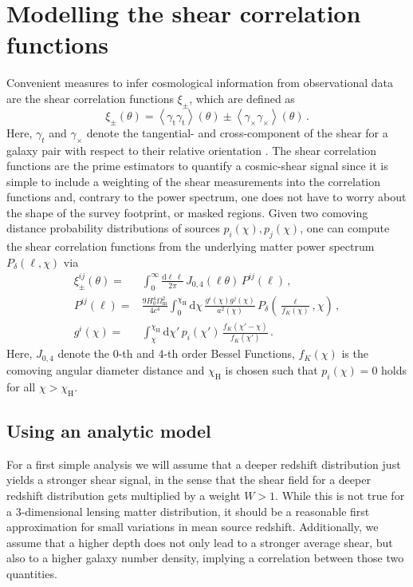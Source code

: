 \documentclass[referee]{aa} %
\renewcommand{\[}{\begin{equation}}
\renewcommand{\]}{\end{equation}}
\renewcommand{\rm}{\mathrm}
\def\la{\left<}
\def\ra{\right>}
\begin{document}

\section{Modelling the shear correlation functions}
\label{sec:xipm}
Convenient measures to infer cosmological information from observational data are the shear correlation functions $\xi_\pm$, which are defined as \[
\xi_\pm(\theta) = \la \gamma_{\rm t}\gamma_{\rm t}\ra(\theta) \pm \la \gamma_\times\gamma_\times\ra(\theta) \, .
\]
Here, $\gamma_t$ and $\gamma_\times$ denote the tangential- and cross-component of the shear for a galaxy pair with respect to their relative orientation \citep[compare][]{2002A&A...396....1S}.
The shear correlation functions are the prime estimators to quantify a cosmic-shear signal since it is simple to include a weighting of the shear measurements into the correlation functions and, contrary to the power spectrum, one does not have to worry about the shape of the survey footprint, or masked regions. Given two comoving distance probability distributions of sources $p_i(\chi),p_j(\chi)$, one can compute the shear correlation functions from the underlying matter power spectrum $P_\delta(\ell,\chi)$ via \citep[compare][]{1992ApJ...388..272K} \begin{align}
\label{eq:xipm-pkappa}
\xi_\pm^{ij}(\theta) =& \int_0^\infty \frac{{\rm d}\ell\,\ell}{2\pi}\, J_{0,4}(\ell\theta)\, P^{ij}(\ell)\, , \\
\label{eq:pkappa-pdelta/lenseff}
P^{ij}(\ell) =& \frac{9 H_0^4\Omega_{\rm m}^2}{4c^4}\int_0^{\chi_{\rm{H}}} {\rm d}\chi\, \frac{g^i(\chi)g^j(\chi)}{a^2(\chi)}\, P_\delta\left(\frac{\ell}{f_K(\chi)},\chi\right)\, , \\
\label{eq:lenseff}
g^i(\chi) =& \int_\chi^{\chi_{\rm{H}}} {\rm d}\chi' \, p_i(\chi') \, \frac{f_K(\chi'-\chi)}{f_K(\chi')}\, .
\end{align}
Here, $J_{0,4}$ denote the 0-th and 4-th order Bessel Functions, $f_K(\chi)$ is the comoving angular diameter distance and $\chi_{\rm{H}}$ is chosen such that $p_i(\chi)=0$ holds for all $\chi>\chi_{\rm{H}}$.
\subsection{Using an analytic model}
\label{sec:xipm_analytic}
For a first simple analysis we will assume that a deeper redshift distribution just yields a stronger shear signal, in the sense that the shear field for a deeper redshift distribution gets multiplied by a weight $W>1$. While this is not true for a 3-dimensional lensing matter distribution, it should be a reasonable first approximation for small variations in mean source redshift. Additionally, we assume that a higher depth does not only lead to a stronger average shear, but also to a higher galaxy number density, implying a correlation between those two quantities.
\end{document}
